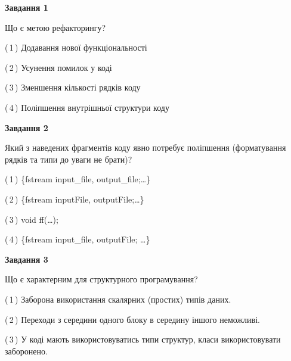 \documentclass[10pt, ukrainian]{article}
\begin{document}
{
\begin {large}
{\begin {center}\textbf{Завдання 1}\end {center}}\par
Що є метою рефакторингу?\par
\vspace{2mm}



(\,1\,) Додавання нової функціональності%



(\,2\,) Усунення помилок у коді%



(\,3\,) Зменшення кількості рядків коду%



(\,4\,) Поліпшення внутрішньої структури коду%


{\begin {center}\textbf{Завдання 2}\end {center}}\par
Який з наведених фрагментів коду явно потребує поліпшення (форматування рядків та типи до уваги не брати)?\par
\vspace{2mm}



(\,1\,) \{fstream input\_file, output\_file;…\} %



(\,2\,) \{fstream inputFile, outputFile;…\} %



(\,3\,) void ff(…);%



(\,4\,) \{fstream input\_file, outputFile; …\}%


{\begin {center}\textbf{Завдання 3}\end {center}}\par
Що є характерним для структурного програмування?\par
\vspace{2mm}



(\,1\,) Заборона використання скалярних (простих) типів даних. %



(\,2\,) Переходи з середини одного блоку в середину іншого неможливі. %



(\,3\,) У коді мають використовуватись типи структур, класи використовувати заборонено. %




\end{large}}
\end{document}
